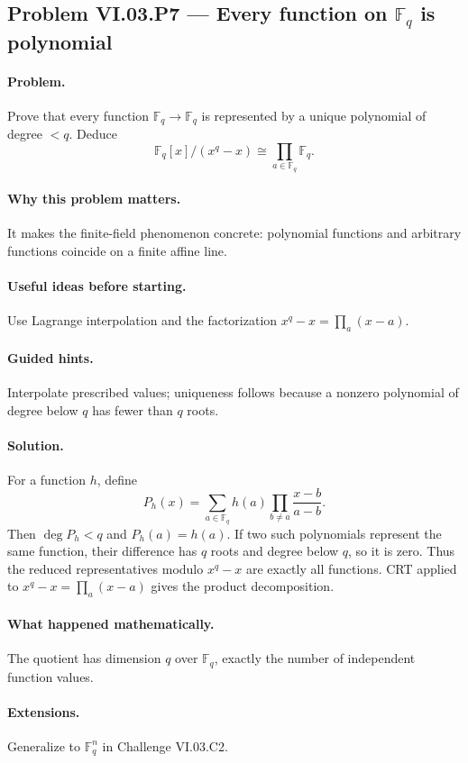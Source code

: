\subsection*{Problem VI.03.P7 --- Every function on \(\mathbb F_q\) is polynomial}
\label{prob:vi03-p7}
\paragraph{Problem.}
Prove that every function \(\mathbb F_q\to\mathbb F_q\) is represented by a unique
polynomial of degree \(<q\).  Deduce
\[
\mathbb F_q[x]/(x^q-x)\cong\prod_{a\in\mathbb F_q}\mathbb F_q.
\]
\ifdefined\FullProblemDossiers
\paragraph{Why this problem matters.} It makes the finite-field phenomenon concrete: polynomial functions and arbitrary functions coincide on a finite affine line.
\paragraph{Useful ideas before starting.} Use Lagrange interpolation and the factorization \(x^q-x=\prod_a(x-a)\).
\paragraph{Guided hints.} Interpolate prescribed values; uniqueness follows because a nonzero polynomial of degree below \(q\) has fewer than \(q\) roots.
\paragraph{Solution.}
For a function \(h\), define
\[
P_h(x)=\sum_{a\in\mathbb F_q}h(a)\prod_{b\neq a}\frac{x-b}{a-b}.
\]
Then \(\deg P_h<q\) and \(P_h(a)=h(a)\).  If two such polynomials represent the same
function, their difference has \(q\) roots and degree below \(q\), so it is zero.  Thus the
reduced representatives modulo \(x^q-x\) are exactly all functions.  CRT applied to
\(x^q-x=\prod_a(x-a)\) gives the product decomposition.
\paragraph{What happened mathematically.} The quotient has dimension \(q\) over \(\mathbb F_q\), exactly the number of independent function values.
\paragraph{Extensions.} Generalize to \(\mathbb F_q^n\) in Challenge VI.03.C2.
\fi
